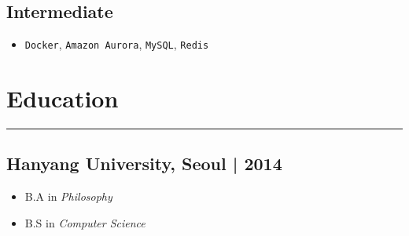 \documentclass[11pt]{article}
\begin{document}
\subsection*{Intermediate}
\label{sec:org45fbaf6}
\begin{itemize}[label=$\circ$,itemsep=-0.5ex]
\item \texttt{Docker}, \texttt{Amazon Aurora}, \texttt{MySQL}, \texttt{Redis}
\end{itemize}

\section*{Education}
\label{sec:org4e19ca3}
\vspace{-4ex}

\noindent\rule{\textwidth}{0.5pt}
\vspace{-4ex}

\subsection*{Hanyang University, Seoul | 2014}
\label{sec:org51211c9}
\begin{itemize}[label=$\circ$,itemsep=-0.5ex]
\item B.A in \emph{Philosophy}
\item B.S in \emph{Computer Science}
\end{itemize}
\end{document}
